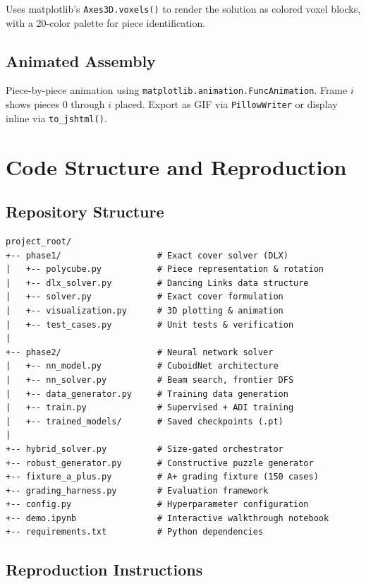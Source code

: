 \documentclass[11pt]{article}
\begin{document}
Uses matplotlib's \texttt{Axes3D.voxels()} to render the solution as colored voxel blocks, with a 20-color palette for piece identification.

\subsection{Animated Assembly}

Piece-by-piece animation using \texttt{matplotlib.animation.FuncAnimation}. Frame $i$ shows pieces $0$ through $i$ placed. Export as GIF via \texttt{PillowWriter} or display inline via \texttt{to\_jshtml()}.

\section{Code Structure and Reproduction}

\subsection{Repository Structure}

\begin{verbatim}
project_root/
+-- phase1/                   # Exact cover solver (DLX)
|   +-- polycube.py           # Piece representation & rotation
|   +-- dlx_solver.py         # Dancing Links data structure
|   +-- solver.py             # Exact cover formulation
|   +-- visualization.py      # 3D plotting & animation
|   +-- test_cases.py         # Unit tests & verification
|
+-- phase2/                   # Neural network solver
|   +-- nn_model.py           # CuboidNet architecture
|   +-- nn_solver.py          # Beam search, frontier DFS
|   +-- data_generator.py     # Training data generation
|   +-- train.py              # Supervised + ADI training
|   +-- trained_models/       # Saved checkpoints (.pt)
|
+-- hybrid_solver.py          # Size-gated orchestrator
+-- robust_generator.py       # Constructive puzzle generator
+-- fixture_a_plus.py         # A+ grading fixture (150 cases)
+-- grading_harness.py        # Evaluation framework
+-- config.py                 # Hyperparameter configuration
+-- demo.ipynb                # Interactive walkthrough notebook
+-- requirements.txt          # Python dependencies
\end{verbatim}

\subsection{Reproduction Instructions}
\end{document}
